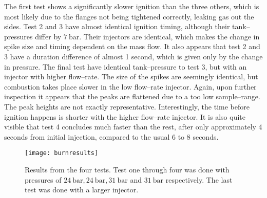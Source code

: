 	The first test shows a significantly slower ignition than the three others, which is most likely due to the flanges not being tightened correctly, leaking gas out the sides. Test 2 and 3 have almost identical ignition timing, although their tank--pressures differ by $\SI{7}{\bar}$. Their injectors are identical, which makes the change in spike size and timing dependent on the mass flow. It also appears that test 2 and 3 have a duration difference of almost 1 second, which is given only by the change in pressure. 
	The final test have identical tank--pressure to test 3, but with an injector with higher flow--rate. The size of the spikes are seemingly identical, but combustion takes place slower in the low flow--rate injector. Again, upon further inspection it appears that the peaks are flattened due to a too low sample--range. The peak heights are not exactly representative. Interestingly, the time before ignition happens is shorter with the higher flow--rate injector. It is also quite visible that test 4 concludes much faster than the rest, after only approximately 4 seconds from initial injection, compared to the usual 6 to 8 seconds.

	\begin{figure}
		\centering
		\texttt{[image: burnresults]}
		\caption{Results from the four tests. Test one through four was done with pressures of $\SI{24}{\bar}, \SI{24}{\bar}, \SI{31}{\bar}$ and $\SI{31}{\bar}$ respectively. The last test was done with a larger injector.}
	\label{fig:burnresults}
	\end{figure}


%

%

